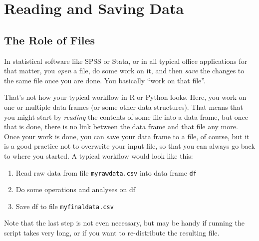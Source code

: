



\section{Reading and Saving Data}
\label{sec:reading}

\subsection{The Role of Files}

In statistical software like SPSS or Stata, or in all typical office applications for that matter, you \emph{open} a file, do some work on it, and then \emph{save} the changes to the same file once you are done. You basically ``work on that file''.

That's not how your typical workflow in R or Python looks.
Here, you work on one or multiple data frames (or some other data structures).
That means that you might start by \emph{reading} the contents of some file into a data frame,
but once that is done, there is no link between the data frame and that file any more.
Once your work is done, you can save your data frame to a file, of course,
but it is a good practice not to overwrite your input file, so that you can always go back to where you started.
A typical workflow would look like this:

\begin{enumerate}
\item Read raw data from file \texttt{\small{myrawdata.csv}} into data frame \texttt{\small{df}}
\item Do some operations and analyses on df
\item Save df to file \texttt{\small{myfinaldata.csv}}
\end{enumerate}
Note that the last step is not even necessary, but may be handy if running the script takes very long, or if you want to re-distribute the resulting file.

